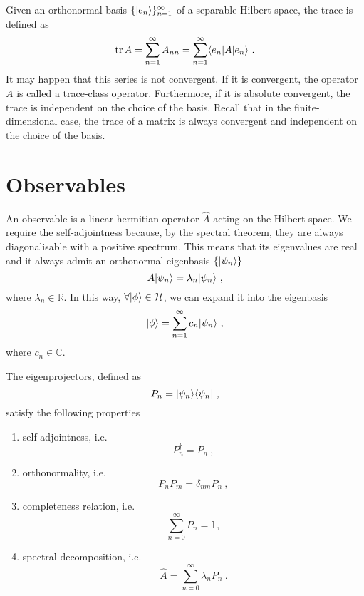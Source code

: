     Given an orthonormal basis $\{\vert e_n\rangle\}_{n=1}^\infty$ of a separable Hilbert space, the trace is defined as 
    \begin{equation*}
        \operatorname{tr} A = \sum_{n=1}^\infty A_{nn} = \sum_{n=1}^\infty \langle e_n\vert A \vert e_n\rangle ~.
    \end{equation*}
    It may happen that this series is not convergent. If it is convergent, the operator $A$ is called a trace-class operator. Furthermore, if it is absolute convergent, the trace is independent on the choice of the basis. Recall that in the finite-dimensional case, the trace of a matrix is always convergent and independent on the choice of the basis.

\section{Observables}

    An observable is a linear hermitian operator $\hat A$ acting on the Hilbert space. We require the self-adjointness because, by the spectral theorem, they are always diagonalisable with a positive spectrum. This means that its eigenvalues are real and it always admit an orthonormal eigenbasis $\{\vert\psi_n\rangle\}$
    \begin{equation}\label{eigen}
        A \vert\psi_n\rangle = \lambda_n \vert\psi_n\rangle ~,
    \end{equation}
    where $\lambda_n \in \mathbb R$. In this way, $\forall \vert\phi\rangle \in \mathcal H$, we can expand it into the eigenbasis 
    \begin{equation}\label{exp}
        \vert\phi\rangle = \sum_{n=1}^{\infty} c_n \vert\psi_n\rangle ~,
    \end{equation}
    where $c_n \in \mathbb C$.

    The eigenprojectors, defined as 
    \begin{equation*}
        P_n = \vert\psi_n\rangle \langle\psi_n\vert ~,
    \end{equation*}
    satisfy the following properties 
    \begin{enumerate}
        \item self-adjointness, i.e.
            \begin{equation*}
                P_n^\dagger = P_n ~,
            \end{equation*}
        \item orthonormality, i.e.
            \begin{equation*}
                P_n P_m = \delta_{nm} P_n ~,
            \end{equation*}
        \item completeness relation, i.e.
            \begin{equation}\label{compl}
                \sum_{n = 0}^{\infty} P_n = \mathbb I~,
            \end{equation}
        \item spectral decomposition, i.e.
            \begin{equation}\label{spec}
                \hat A = \sum_{n=0}^{\infty} \lambda_n P_n ~.
            \end{equation}
    \end{enumerate}

